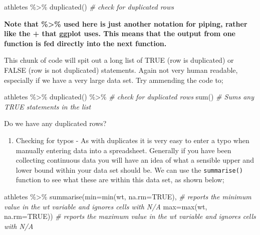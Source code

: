 \documentclass[
]{book}
\newenvironment{Shaded}{\begin{snugshade}}{\end{snugshade}}
\newcommand{\AttributeTok}[1]{\textcolor[rgb]{0.77,0.63,0.00}{#1}}
\newcommand{\CommentTok}[1]{\textcolor[rgb]{0.56,0.35,0.01}{\textit{#1}}}
\newcommand{\ConstantTok}[1]{\textcolor[rgb]{0.00,0.00,0.00}{#1}}
\newcommand{\FunctionTok}[1]{\textcolor[rgb]{0.00,0.00,0.00}{#1}}
\newcommand{\NormalTok}[1]{#1}
\newcommand{\SpecialCharTok}[1]{\textcolor[rgb]{0.00,0.00,0.00}{#1}}
\providecommand{\tightlist}{%
  \setlength{\itemsep}{0pt}\setlength{\parskip}{0pt}}
\begin{document}
\begin{Shaded}
\begin{Highlighting}[]
\NormalTok{athletes }\SpecialCharTok{\%\textgreater{}\%}
  \FunctionTok{duplicated}\NormalTok{() }\CommentTok{\# check for duplicated rows}
\end{Highlighting}
\end{Shaded}

\textbf{Note that \%\textgreater\% used here is just another notation for piping, rather like the + that ggplot uses. This means that the output from one function is fed directly into the next function.}

This chunk of code will spit out a long list of TRUE (row is duplicated) or FALSE (row is not duplicated) statements. Again not very human readable, especially if we have a very large data set. Try ammending the code to;

\begin{Shaded}
\begin{Highlighting}[]
\NormalTok{athletes }\SpecialCharTok{\%\textgreater{}\%}
  \FunctionTok{duplicated}\NormalTok{() }\SpecialCharTok{\%\textgreater{}\%} \CommentTok{\# check for duplicated rows}
  \FunctionTok{sum}\NormalTok{() }\CommentTok{\# Sums any TRUE statements in the list }
\end{Highlighting}
\end{Shaded}

Do we have any duplicated rows?

\begin{enumerate}
\def\labelenumi{\arabic{enumi})}
\setcounter{enumi}{1}
\tightlist
\item
  Checking for typos - As with duplicates it is very easy to enter a typo when manually entering data into a spreadsheet. Generally if you have been collecting continuous data you will have an idea of what a sensible upper and lower bound within your data set should be. We can use the \texttt{summarise()} function to see what these are within this data set, as shown below;
\end{enumerate}

\begin{Shaded}
\begin{Highlighting}[]
\NormalTok{athletes }\SpecialCharTok{\%\textgreater{}\%} 
  \FunctionTok{summarise}\NormalTok{(}\AttributeTok{min=}\FunctionTok{min}\NormalTok{(wt, }\AttributeTok{na.rm=}\ConstantTok{TRUE}\NormalTok{), }\CommentTok{\# reports the minimum value in the wt variable and ignores cells with N/A}
            \AttributeTok{max=}\FunctionTok{max}\NormalTok{(wt, }\AttributeTok{na.rm=}\ConstantTok{TRUE}\NormalTok{)) }\CommentTok{\# reports the maximum value in the wt variable and ignores cells with N/A}
\end{Highlighting}
\end{Shaded}
\end{document}
